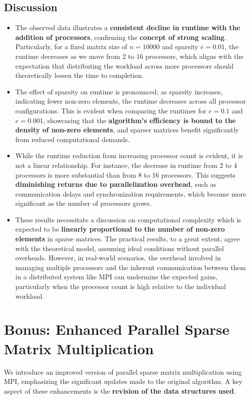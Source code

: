 \documentclass{article}
\begin{document}
\subsection{Discussion}
\begin{itemize}
    \item The observed data illustrates a \textbf{consistent decline in runtime with the addition of processors}, confirming the \textbf{concept of strong scaling}. Particularly, for a fixed matrix size of \( n = 10000 \) and sparsity \( e = 0.01 \), the runtime decreases as we move from 2 to 16 processors, which aligns with the expectation that distributing the workload across more processors should theoretically lessen the time to completion.
    \item The effect of sparsity on runtime is pronounced; as sparsity increases, indicating fewer non-zero elements, the runtime decreases across all processor configurations. This is evident when comparing the runtimes for \( e = 0.1 \) and \( e = 0.001 \), showcasing that the \textbf{algorithm's efficiency is bound to the density of non-zero elements}, and sparser matrices benefit significantly from reduced computational demands.
    \item While the runtime reduction from increasing processor count is evident, it is not a linear relationship. For instance, the decrease in runtime from 2 to 4 processors is more substantial than from 8 to 16 processors. This suggests \textbf{diminishing returns due to parallelization overhead}, such as communication delays and synchronization requirements, which become more significant as the number of processors grows.
    \item These results necessitate a discussion on computational complexity which is expected to be \textbf{linearly proportional to the number of non-zero elements} in sparse matrices. The practical results, to a great extent, agree with the theoretical model, assuming ideal conditions without parallel overheads. However, in real-world scenarios, the overhead involved in managing multiple processors and the inherent communication between them in a distributed system like MPI can undermine the expected gains, particularly when the processor count is high relative to the individual workload.
\end{itemize}

\section{Bonus: Enhanced Parallel Sparse Matrix Multiplication}
We introduce an improved version of parallel sparse matrix multiplication using MPI, emphasizing the significant updates made to the original algorithm. A key aspect of these enhancements is the \textbf{revision of the data structures used}.
\end{document}
